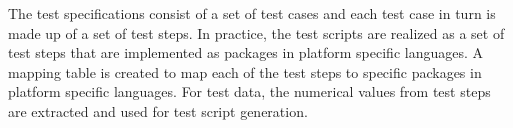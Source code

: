 The test specifications consist of a set of test cases and each test case in turn is made up of a set of test steps. In practice, the test scripts are realized as a set of test steps that are implemented as packages in platform specific languages. A mapping table is created to map each of the test steps to specific packages in platform specific languages. For test data, the numerical values from test steps are extracted and used for test script generation.



